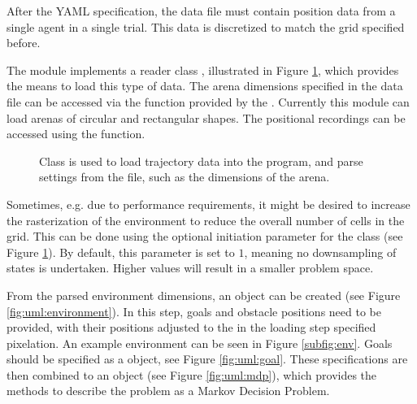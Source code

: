After the YAML specification, the data file must contain position data from a single agent in a single trial.
This data is discretized to match the grid specified before.

The module  implements a reader class , illustrated in Figure \ref{fig:uml:csvreader}, which provides the means to load this type of data.
The arena dimensions specified in the data file can be accessed via the  function provided by the . Currently this module can load arenas of circular and rectangular shapes.
The positional recordings can be accessed using the  function.

\begin{figure}
	\centering
{}
\caption{Class  is used to load trajectory data into the program, and parse settings from the file, such as the dimensions of the arena.}
\label{fig:uml:csvreader}
\end{figure}

Sometimes, e.g. due to performance requirements, it might be desired to increase the rasterization of the environment to reduce the overall number of cells in the grid.
This can be done using the optional initiation parameter  for the  class (see Figure \ref{fig:uml:csvreader}).
By default, this parameter is set to $1$, meaning no downsampling of states is undertaken.
Higher values will result in a smaller problem space.

From the parsed environment dimensions, an  object can be created (see Figure \ref{fig:uml:environment}).
In this step, goals and obstacle positions need to be provided, with their positions adjusted to the in the loading step specified pixelation.
An example environment can be seen in Figure \ref{subfig:env}.
Goals should be specified as a  object, see Figure \ref{fig:uml:goal}.
These specifications are then combined to an  object (see Figure \ref{fig:uml:mdp}), which provides the methods to describe the problem as a Markov Decision Problem.

